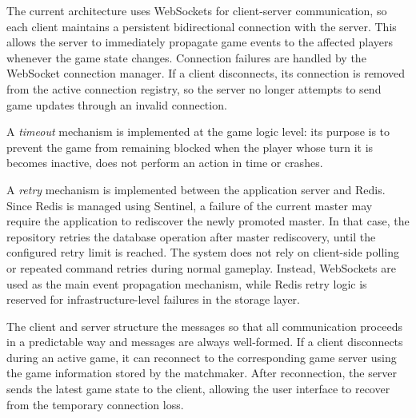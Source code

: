 \documentclass{scrartcl}
\begin{document}
  
  The current architecture uses WebSockets for client-server communication, so each client maintains a persistent bidirectional connection with the server. 
  This allows the server to immediately propagate game events to the affected players whenever the game state changes. \newline
  Connection failures are handled by the WebSocket connection manager. If a client disconnects, its connection is removed from the active connection registry, so the server no longer attempts to send game updates through an invalid connection.
  
  A \emph{timeout} mechanism is implemented at the game logic level: its purpose is to prevent the game from remaining blocked when the player whose turn it is becomes inactive, does not perform an action in time or crashes.

  A \emph{retry} mechanism is implemented between the application server and Redis. 
  Since Redis is managed using Sentinel, a failure of the current master may require the application to rediscover the newly promoted master. In that case, the repository retries the database operation after master rediscovery, until the configured retry limit is reached.
  The system does not rely on client-side polling or repeated command retries during normal gameplay. Instead, WebSockets are used as the main event propagation mechanism, while Redis retry logic is reserved for infrastructure-level failures in the storage layer.
  
  The client and server structure the messages so that all communication proceeds in a predictable way and messages are always well-formed. 
  If a client disconnects during an active game, it can reconnect to the corresponding game server using the game information stored by the matchmaker. 
  After reconnection, the server sends the latest game state to the client, allowing the user interface to recover from the temporary connection loss.
\end{document}
